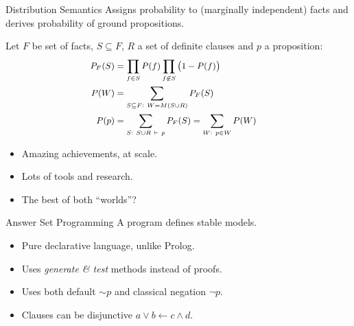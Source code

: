 \documentclass[bigger]{beamer}
\begin{document}
    \begin{frame}{Distribution Semantics}
        Assigns probability to (marginally independent) facts and derives probability of ground propositions.

        Let $F$ be set of facts, $S\subseteq F$, $R$ a set of definite clauses and $p$ a proposition:
        $$\small
        \begin{aligned}
            P_F(S) &= \prod_{f \in S} P(f) \prod_{f \not\in S} \left(1 - P(f) \right) \cr
            P(W) &= \sum_{S \subseteq F :~W=M(S\cup R)} P_F(S) \cr
            P(p) &= \sum_{S :~ S\cup R ~\vdash~ p} P_F(S) = \sum_{W :~ p\in W} P(W)
        \end{aligned}
        $$
        \begin{itemize}
            \item Amazing achievements, at scale.
            \item Lots of tools and research.
            \item The best of both ``worlds''?
        \end{itemize}
        
    \end{frame}

    \begin{frame}{Answer Set Programming}
        A program defines stable models.  
        \begin{itemize}
            \item Pure declarative language, unlike Prolog.
            \item Uses \emph{generate \& test} methods instead of proofs.
            \item Uses both default $\sim\!p$ and classical negation $\neg p$.
            \item Clauses can be disjunctive $a \vee b \leftarrow c \wedge d$.
        \end{itemize}
    \end{frame}
\end{document}
